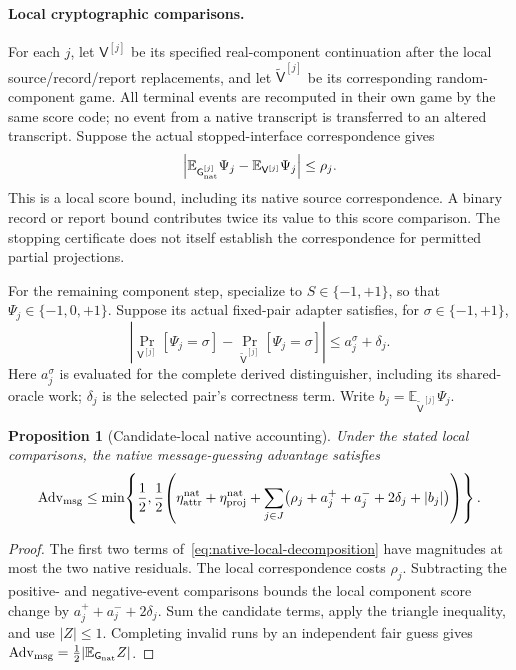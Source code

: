 \documentclass[pdflatex]{sn-jnl}
\theoremstyle{thmstyleone}
\newtheorem{proposition}[theorem]{Proposition}
\theoremstyle{thmstylethree}
\theoremstyle{thmstyletwo}
\begin{document}
\paragraph{Local cryptographic comparisons.}
For each $j$, let $\mathsf V^{[j]}$ be its specified real-component
continuation after the local source/record/report replacements, and let
$\widetilde{\mathsf V}^{[j]}$ be its corresponding random-component game.
All terminal events are recomputed in their own game by the same score code;
no event from a native transcript is transferred to an altered transcript.
Suppose the actual stopped-interface correspondence gives
\[
 \left|\mathbb E_{\mathsf G_{\rm nat}^{[j]}}\Psi_j
       -\mathbb E_{\mathsf V^{[j]}}\Psi_j\right|\le\rho_j.
\]
This is a local score bound, including its native source correspondence.
A binary record or report bound contributes twice its value to this score
comparison.  The stopping certificate does not itself establish the
correspondence for permitted partial projections.

For the remaining component step, specialize to $S\in\{-1,+1\}$, so that
$\Psi_j\in\{-1,0,+1\}$.  Suppose its actual fixed-pair adapter satisfies,
for $\sigma\in\{-1,+1\}$,
\[
 \left|\Pr_{\mathsf V^{[j]}}[\Psi_j=\sigma]
       -\Pr_{\widetilde{\mathsf V}^{[j]}}[\Psi_j=\sigma]\right|
 \le a_j^\sigma+\delta_j.
\]
Here $a_j^\sigma$ is evaluated for the complete derived distinguisher,
including its shared-oracle work; $\delta_j$ is the selected pair's correctness term. Write
$b_j=\mathbb E_{\widetilde{\mathsf V}^{[j]}}\Psi_j$.

\begin{proposition}[Candidate-local native accounting]
\label{prop:native-local-accounting}
Under the stated local comparisons, the native message-guessing advantage
satisfies
\[
 \operatorname{Adv}_{\rm msg}
 \le\min\!\left\{\frac12,\frac12\!\left(
 \eta_{\rm attr}^{\rm nat}+\eta_{\rm proj}^{\rm nat}
 +\sum_{j\in J}
    \bigl(\rho_j+a_j^++a_j^-+2\delta_j+|b_j|\bigr)
 \right)\right\}.
\]
\end{proposition}
\begin{proof}
The first two terms of~\eqref{eq:native-local-decomposition} have magnitudes
at most the two native residuals.  The local correspondence costs $\rho_j$.
Subtracting the positive- and negative-event comparisons bounds the local
component score change by $a_j^++a_j^-+2\delta_j$.  Sum the candidate terms,
apply the triangle inequality, and use $|Z|\le1$.  Completing invalid runs
by an independent fair guess gives
$\operatorname{Adv}_{\rm msg}=\tfrac12|\mathbb E_{\mathsf G_{\rm nat}}Z|$.
\end{proof}
\end{document}
